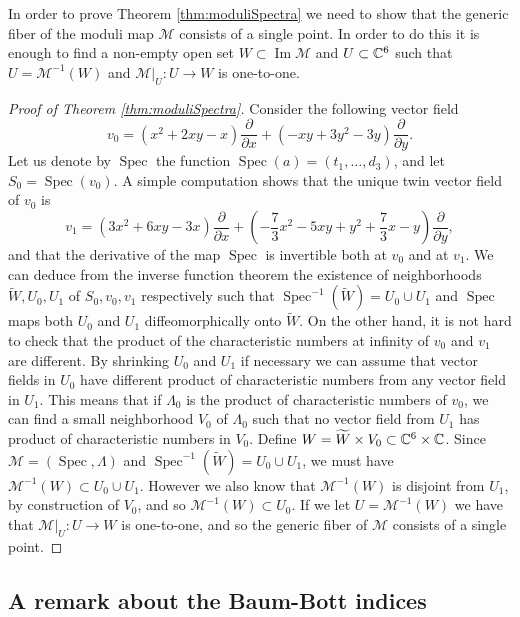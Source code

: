 \documentclass[phd,tocprelim]{cornell}
\begin{document}
In order to prove Theorem \ref{thm:moduliSpectra} we need to show that the generic fiber of the moduli map $\mathcal{M}$ consists of a single point. In order to do this it is enough to find a non-empty open set $W\subset\operatorname{Im }\mathcal{M}$ and $U\subset\mathbb{C}^6$ such that $U=\mathcal{M}^{-1}(W)$ and $\mathcal{M}\vert_{U}\colon U\to W$ is one-to-one.

\begin{proof}[Proof of Theorem \ref*{thm:moduliSpectra}]
Consider the following vector field
\[ v_0 = (x^2+2xy-x)\frac{\partial}{\partial x}+(-xy+3y^2-3y)\frac{\partial}{\partial y}. \]
Let us denote by $\operatorname{Spec}$ the function $\operatorname{Spec}(a)=(t_1,\ldots,d_3)$, and let $S_0=\operatorname{Spec}(v_0)$. A simple computation shows that the unique twin vector field of $v_0$ is
\[ v_1 = (3x^2+6xy-3x)\frac{\partial}{\partial x}+\left(-\frac{7}{3}x^2-5xy+y^2+\frac{7}{3}x-y\right)\frac{\partial}{\partial y}, \]
and that the derivative of the map $\operatorname{Spec}$ is invertible both at $v_0$ and at $v_1$. We can deduce from the inverse function theorem the existence of neighborhoods $\widetilde{W}, U_0, U_1$ of $S_0,v_0,v_1$ respectively such that $\operatorname{Spec}^{-1}(\widetilde{W})= U_0\cup U_1$ and $\operatorname{Spec}$ maps both $ U_0$ and $ U_1$ diffeomorphically onto $\widetilde{W}$. On the other hand, it is not hard to check that the product of the characteristic numbers at infinity of $v_0$ and $v_1$ are different. By shrinking $ U_0$ and $ U_1$ if necessary we can assume that vector fields in $ U_0$ have different product of characteristic numbers from any vector field in $ U_1$. This means that if $\Lambda_0$ is the product of characteristic numbers of $v_0$, we can find a small neighborhood $V_0$ of $\Lambda_0$ such that no vector field from $ U_1$ has product of characteristic numbers in $V_0$. Define $W=\widetilde{W}\times V_0\subset\mathbb{C}^6\times\mathbb{C}$. Since $\mathcal{M}=(\operatorname{Spec},\Lambda)$ and $\operatorname{Spec}^{-1}(\widetilde{W})= U_0\cup U_1$, we must have $\mathcal{M}^{-1}(W)\subset  U_0\cup U_1$. However we also know that $\mathcal{M}^{-1}(W)$ is disjoint from $ U_1$, by construction of $V_0$, and so $\mathcal{M}^{-1}(W)\subset U_0$. If we let $U=\mathcal{M}^{-1}(W)$ we have that $\mathcal{M}\vert_{U}\colon U\to W$ is one-to-one, and so the generic fiber of $\mathcal{M}$ consists of a single point.
\end{proof}


\subsection{A remark about the Baum-Bott indices}
\end{document}
